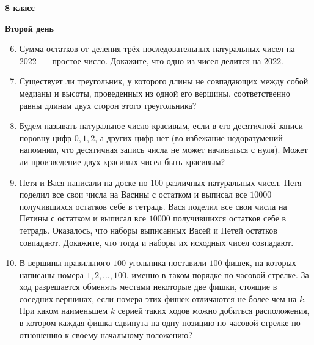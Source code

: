 \documentclass{article}
\begin{document}
\large
	
\begin{center}
	\LARGE\textbf{8 класс}
\end{center}
\begin{center}
	\large\textbf{Второй день}
\end{center}


\begin{enumerate}[label*=8.{\arabic{enumi}}]
\setcounter{enumi}{5}
\item Сумма остатков от деления трёх последовательных натуральных чисел на $2022$~--- простое число. Докажите, что одно из чисел делится на $2022$.
\item Существует ли треугольник, у которого длины не совпадающих между собой медианы и высоты, проведенных из одной его вершины, соответственно равны длинам двух сторон этого треугольника?
\item Будем называть натуральное число красивым, если в его десятичной записи поровну цифр $0, 1, 2$, а других цифр нет (во избежание недоразумений напомним, что десятичная запись числа не может начинаться с нуля). Может ли произведение двух красивых чисел быть красивым?
\item Петя и Вася написали на доске по $100$ различных натуральных чисел. Петя поделил все свои числа на Васины с остатком и выписал все $10000$ получившихся остатков себе в тетрадь. Вася поделил все свои числа на Петины с остатком и выписал все $10000$ получившихся остатков себе в тетрадь. Оказалось, что наборы выписанных Васей и Петей остатков совпадают. Докажите, что тогда и наборы их исходных чисел совпадают.
\item В вершины правильного $100$-угольника поставили $100$ фишек, на которых написаны номера $1, 2, \dotsc, 100$, именно в таком порядке по часовой стрелке. За ход разрешается обменять местами некоторые две фишки, стоящие в соседних вершинах, если номера этих фишек отличаются не более чем на $k$. При каком наименьшем $k$ серией таких ходов можно добиться расположения, в котором каждая фишка сдвинута на одну позицию по часовой стрелке по отношению к своему начальному положению?

\end{enumerate}
\end{document}
